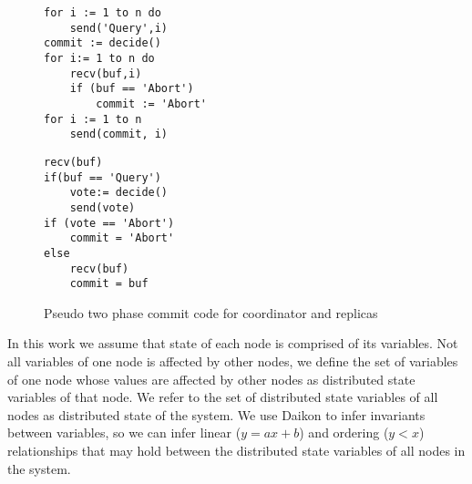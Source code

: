\begin{figure}
\centering
\begin{minipage}{.45\textwidth}
\begin{lstlisting}[caption={Coordinator Code}]
for i := 1 to n do
	send('Query',i)
commit := decide()
for i:= 1 to n do
	recv(buf,i)
	if (buf == 'Abort')
		commit := 'Abort'
for i := 1 to n
	send(commit, i)
\end{lstlisting}
\end{minipage}\hfill
\begin{minipage}{.45\textwidth}
\begin{lstlisting}[caption={Replica Code}]
recv(buf)
if(buf == 'Query')
	vote:= decide()
	send(vote)
if (vote == 'Abort')
	commit = 'Abort'
else
	recv(buf)
	commit = buf
\end{lstlisting}
\end{minipage}\hfill
\caption{Pseudo two phase commit code for coordinator and replicas}
\label{lst:2pc}
\end{figure}



In this work we 
assume that state of each node is comprised of its variables. Not all variables of one node is affected by other nodes, we define the set of variables of one node whose values are affected by other nodes as distributed state variables of that node. We refer to the set of distributed 
state variables of all nodes as distributed state of the system. We use Daikon \cite{ernst2001dynamically} to infer invariants between variables, so we can infer linear ($y = ax + b$) and ordering ($y < x$) relationships that may hold between the distributed state variables of all nodes in the system.



